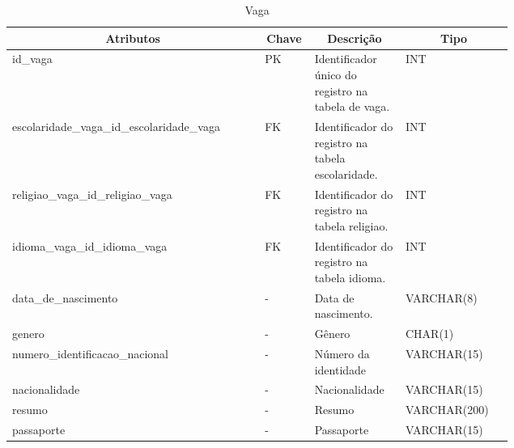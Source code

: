 \begin{enumerate}
    \begin{table}[H]
    \caption{Vaga}
    \label{vaga}
    	\centering\footnotesize
        \begin{tabular}{|p{0.40\linewidth} | p{0.04\linewidth} |  p{0.12\linewidth} | p{0.16\linewidth} |}  \hline
        \multicolumn{1}{|c|}{\textbf{Atributos}} &
        \multicolumn{1}{|c|}{\textbf{Chave}} &
        \multicolumn{1}{c|}{\textbf{Descrição}} &
        \multicolumn{1}{c|}{\textbf{Tipo}} \\ \hline
          
        id\_vaga  &  
        PK & 
        Identificador único do registro na tabela de vaga. &
        INT
        \\  \hline
        
        escolaridade\_vaga\_id\_escolaridade\_vaga & 
        FK & 
        Identificador do registro na tabela escolaridade. &
        INT
        \\ \hline
        
       religiao\_vaga\_id\_religiao\_vaga &
       FK &
       Identificador do registro na tabela religiao. &
       INT
       \\ \hline
       
       idioma\_vaga\_id\_idioma\_vaga &
       FK &
       Identificador do registro na tabela idioma. &
       INT
       \\ \hline
       
       data\_de\_nascimento &
       - &
       Data de nascimento. &
       VARCHAR(8)
       \\ \hline
       
       genero &
       - &
       Gênero &
       CHAR(1)
       \\ \hline
       
       numero\_identificacao\_nacional &
       - &
       Número da identidade &
       VARCHAR(15)
       \\ \hline
       
       nacionalidade &
       - &
       Nacionalidade &
       VARCHAR(15)
       \\ \hline
       
       resumo &
       - &
       Resumo &
       VARCHAR(200)
       \\ \hline
       
       passaporte &
       - &
       Passaporte &
       VARCHAR(15)
       \\ \hline
       

\end{tabular}
\end{table}
\end{enumerate}
